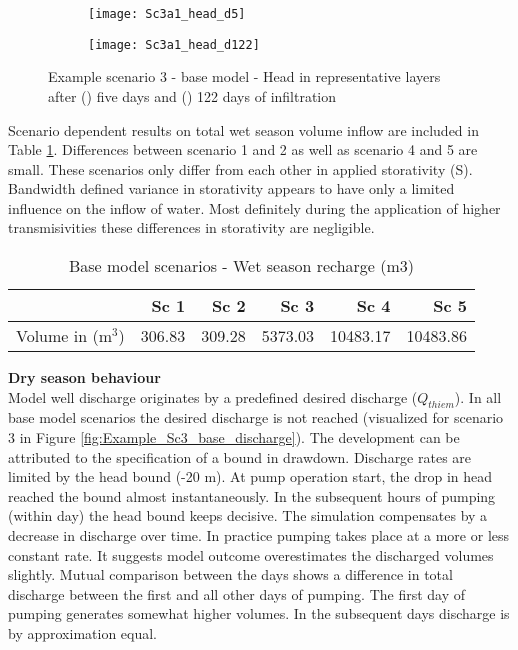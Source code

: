 \begin{figure}[h!]
	\centering
	\begin{subfigure}[b]{0.5\linewidth}
		\centering\texttt{[image: Sc3a1\_head\_d5]}
		\captionsetup{justification=centering}		
		\caption{\label{fig:Sc3a1_head_d5}}
		\end{subfigure}\hfill
	\begin{subfigure}[b]{0.5\linewidth}
        \centering\texttt{[image: Sc3a1\_head\_d122]}
		\captionsetup{justification=centering}		
		\caption{\label{fig:Sc3a1_head_d122}}
		\end{subfigure}
		\captionsetup{justification=centering}	
	\caption{Example scenario 3 - base model - Head in representative layers after () five days and () 122 days of infiltration} 
	\label{fig:Example_Sc3_base_head_wet}
\end{figure} 

Scenario dependent results on total wet season volume inflow are included in Table \ref{tab:Base_recharge}. Differences between scenario 1 and 2 as well as scenario 4 and 5 are small. These scenarios only differ from each other in applied storativity (S). Bandwidth defined variance in storativity appears to have only a limited influence on the inflow of water. Most definitely during the application of higher transmisivities these differences in storativity are negligible.   

\begin{table}[h!]
\small
\centering
\caption{Base model scenarios - Wet season recharge (m3)}
\label{tab:Base_recharge}
\begin{tabular}{l|r|r|r|r|r}
\hline 
\textbf{}               & \textbf{Sc 1} & \textbf{Sc 2} & \textbf{Sc 3} & \textbf{Sc 4}  & \textbf{Sc 5} \\ \hline \hline
Volume in (m$^3$)       & 306.83        & 309.28        & 5373.03       & 10483.17       & 10483.86          \\ \hline    
\end{tabular}
\end{table}

\textbf{Dry season behaviour} \\
Model well discharge originates by a predefined desired discharge ($Q_{thiem}$). In all base model scenarios the desired discharge is not reached (visualized for scenario 3 in Figure \ref{fig:Example_Sc3_base_discharge}). The development can be attributed to the specification of a bound in drawdown. Discharge rates are limited by the head bound (-20 m). At pump operation start, the drop in head reached the bound almost instantaneously. In the subsequent hours of pumping (within day) the head bound keeps decisive. The simulation compensates by a decrease in discharge over time. In practice pumping takes place at a more or less constant rate. It suggests model outcome overestimates the discharged volumes slightly. Mutual comparison between the days shows a difference in total discharge between the first and all other days of pumping. The first day of pumping generates somewhat higher volumes. In the subsequent days discharge is by approximation equal. \\

